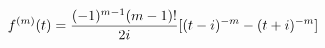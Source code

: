 \documentclass[preview]{standalone}
\begin{document}
\begin{align*}
\special{dvisvgm:raw <g id='unique000'>}f^{(m)}(t)=\frac{(-1)^{m-1}(m-1)!}{2i}[(t-i)^{-m}-(t+i)^{-m}]\special{dvisvgm:raw </g>}
\end{align*}
\end{document}
